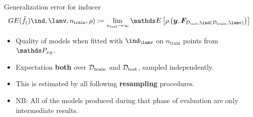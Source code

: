 





\begin{vbframe}{Generalization error for inducer}
  $$\GEfull := 
  \lim_{\ntest \rightarrow \infty} \E \left[ \rho \left(
  \yv, \F_{\Dtest, \ind(\D_{\mathrm{train}}, \lamv)} 
  \right)\right]$$

\begin{itemize}
  \item Quality of models when fitted with $\Ilam$ on 
      $n_{\mathrm{train}}$ points from $\Pxy$.
  \item Expectation \textbf{both} over $\mathcal{D}_{\text{train}}$ and $\mathcal{D}_{\text{test}}$, sampled independently.
  \item This is estimated by all following \textbf{resampling} procedures. 
  \item NB: All of the models produced during that phase of evaluation are only
    intermediate results.
\end{itemize}
\end{vbframe}

